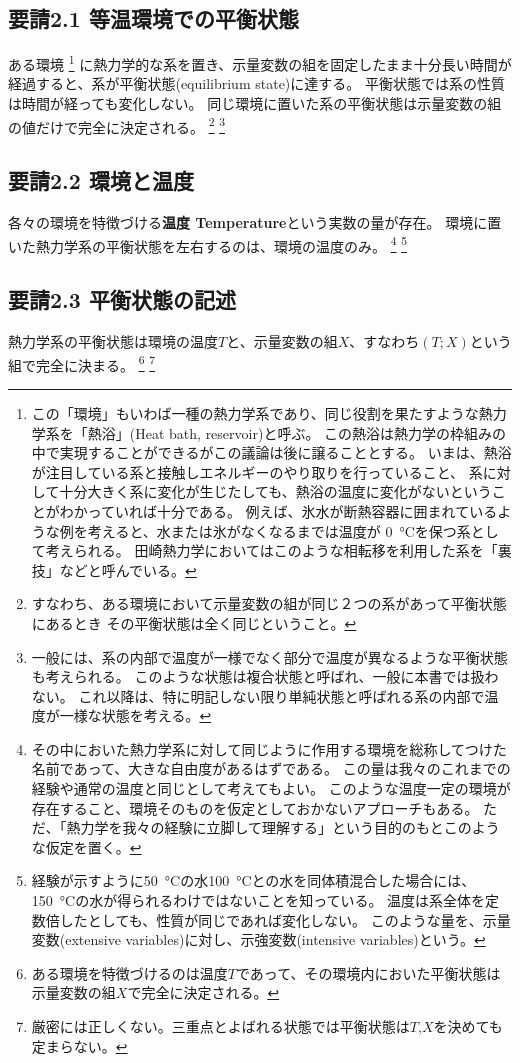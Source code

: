 \subsection*{要請2.1 等温環境での平衡状態}
ある環境
\footnote{
  この「環境」もいわば一種の熱力学系であり、同じ役割を果たすような熱力学系を「熱浴」(Heat bath, reservoir)と呼ぶ。
  この熱浴は熱力学の枠組みの中で実現することができるがこの議論は後に譲ることとする。
  いまは、熱浴が注目している系と接触しエネルギーのやり取りを行っていること、
  系に対して十分大きく系に変化が生じたしても、熱浴の温度に変化がないということがわかっていれば十分である。
  例えば、氷水が断熱容器に囲まれているような例を考えると、水または氷がなくなるまでは温度が
  \SI{0}{\celsius}を保つ系として考えられる。
  田崎熱力学においてはこのような相転移を利用した系を「裏技」などと呼んでいる。
}
に熱力学的な系を置き、示量変数の組を固定したまま十分長い時間が経過すると、系が平衡状態(equilibrium state)に達する。
平衡状態では系の性質は時間が経っても変化しない。
同じ環境に置いた系の平衡状態は示量変数の組の値だけで完全に決定される。
\footnote{
  すなわち、ある環境において示量変数の組が同じ２つの系があって平衡状態にあるとき
  その平衡状態は全く同じということ。
}
\footnote{
  一般には、系の内部で温度が一様でなく部分で温度が異なるような平衡状態も考えられる。
  このような状態は複合状態と呼ばれ、一般に本書では扱わない。
  これ以降は、特に明記しない限り単純状態と呼ばれる系の内部で温度が一様な状態を考える。
}

\subsection*{要請2.2 環境と温度}
各々の環境を特徴づける\textbf{温度 Temperature}という実数の量が存在。
環境に置いた熱力学系の平衡状態を左右するのは、環境の温度のみ。
\footnote{
  その中においた熱力学系に対して同じように作用する環境を総称してつけた名前であって、大きな自由度があるはずである。
  この量は我々のこれまでの経験や通常の温度と同じとして考えてもよい。
  このような温度一定の環境が存在すること、環境そのものを仮定としておかないアプローチもある。
  ただ、「熱力学を我々の経験に立脚して理解する」という目的のもとこのような仮定を置く。
}
\footnote{
  経験が示すように\SI{50}{\celsius}の水\SI{100}{\celsius}との水を同体積混合した場合には、\SI{150}{\celsius}の水が得られるわけではないことを知っている。
  温度は系全体を定数倍したとしても、性質が同じであれば変化しない。
  このような量を、示量変数(extensive variables)に対し、示強変数(intensive variables)という。
}

\subsection*{要請2.3 平衡状態の記述}
熱力学系の平衡状態は環境の温度$T$と、示量変数の組$X$、すなわち$(T;X)$という組で完全に決まる。
\footnote{
  ある環境を特徴づけるのは温度$T$であって、その環境内においた平衡状態は示量変数の組$X$で完全に決定される。
}
\footnote{
  厳密には正しくない。三重点とよばれる状態では平衡状態は$T$,$X$を決めても定まらない。
}

